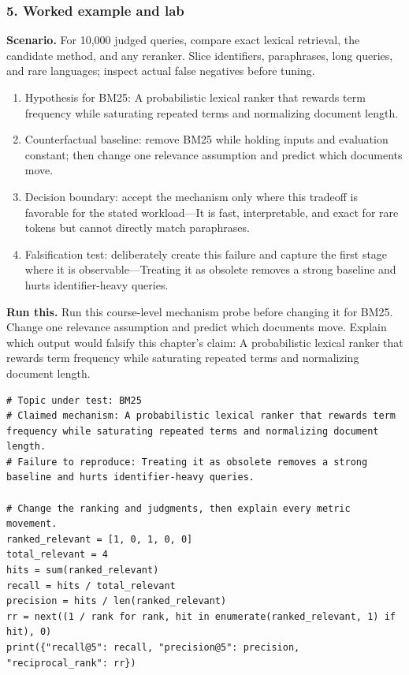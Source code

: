 \subsubsection*{5. Worked example and lab}
\textbf{Scenario.} For 10,000 judged queries, compare exact lexical retrieval, the candidate method, and any reranker. Slice identifiers, paraphrases, long queries, and rare languages; inspect actual false negatives before tuning.
\begin{enumerate}
\item Hypothesis for BM25: A probabilistic lexical ranker that rewards term frequency while saturating repeated terms and normalizing document length.
\item Counterfactual baseline: remove BM25 while holding inputs and evaluation constant; then change one relevance assumption and predict which documents move.
\item Decision boundary: accept the mechanism only where this tradeoff is favorable for the stated workload—It is fast, interpretable, and exact for rare tokens but cannot directly match paraphrases.
\item Falsification test: deliberately create this failure and capture the first stage where it is observable—Treating it as obsolete removes a strong baseline and hurts identifier-heavy queries.
\end{enumerate}
\textbf{Run this.} Run this course-level mechanism probe before changing it for BM25. Change one relevance assumption and predict which documents move. Explain which output would falsify this chapter's claim: A probabilistic lexical ranker that rewards term frequency while saturating repeated terms and normalizing document length.
\begin{Verbatim}[fontsize=\scriptsize]
# Topic under test: BM25
# Claimed mechanism: A probabilistic lexical ranker that rewards term frequency while saturating repeated terms and normalizing document length.
# Failure to reproduce: Treating it as obsolete removes a strong baseline and hurts identifier-heavy queries.

# Change the ranking and judgments, then explain every metric movement.
ranked_relevant = [1, 0, 1, 0, 0]
total_relevant = 4
hits = sum(ranked_relevant)
recall = hits / total_relevant
precision = hits / len(ranked_relevant)
rr = next((1 / rank for rank, hit in enumerate(ranked_relevant, 1) if hit), 0)
print({"recall@5": recall, "precision@5": precision, "reciprocal_rank": rr})
\end{Verbatim}
